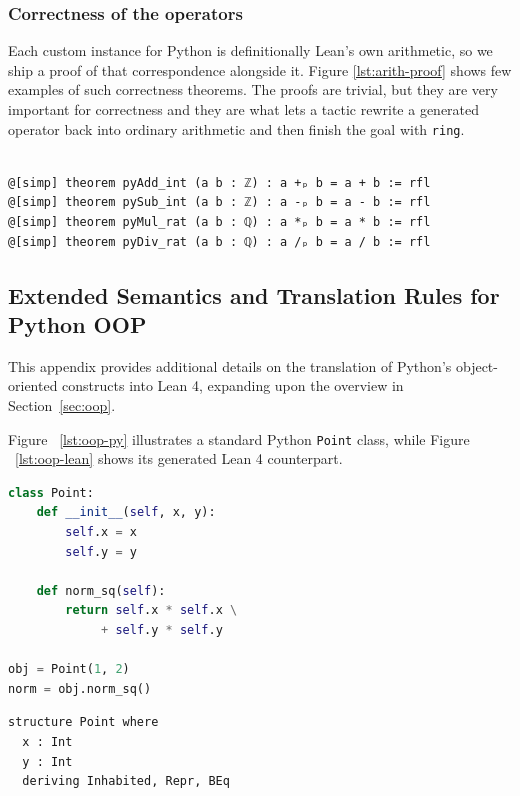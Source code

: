 \documentclass{article}
\newcommand{\code}{\lstinline}
\begin{document}
{\subsubsection{Correctness of the operators} \label{arith-correct}

Each custom instance for Python is definitionally Lean's own arithmetic, so we ship a proof of that correspondence alongside it. Figure \ref{lst:arith-proof} shows few examples of such correctness theorems. The proofs are trivial, but they are very important for correctness and they are what lets a tactic rewrite a generated operator back into ordinary arithmetic and then finish the goal with \code{ring}.

\begin{lstlisting}[style=lean,caption={Arithmetic Operation Proofs},label={lst:arith-proof}]

@[simp] theorem pyAdd_int (a b : ℤ) : a +ₚ b = a + b := rfl
@[simp] theorem pySub_int (a b : ℤ) : a -ₚ b = a - b := rfl
@[simp] theorem pyMul_rat (a b : ℚ) : a *ₚ b = a * b := rfl
@[simp] theorem pyDiv_rat (a b : ℚ) : a /ₚ b = a / b := rfl

\end{lstlisting}

\subsection{Extended Semantics and Translation Rules for Python OOP} \label{oop-appendix}

This appendix provides additional details on the translation of Python's object-oriented constructs into Lean 4, expanding upon the overview in Section~\ref{sec:oop}.

Figure ~\ref{lst:oop-py} illustrates a standard Python \texttt{Point} class, while Figure ~\ref{lst:oop-lean} shows its generated Lean 4 counterpart.

\noindent
\begin{minipage}[t]{0.48\textwidth}
\begin{lstlisting}[language=python, caption={Python \texttt{Point} class.}, label={lst:oop-py}, breaklines=true]
class Point:
    def __init__(self, x, y):
        self.x = x
        self.y = y

    def norm_sq(self):
        return self.x * self.x \
             + self.y * self.y

obj = Point(1, 2)
norm = obj.norm_sq()
\end{lstlisting}
\end{minipage}%
\hfill
\begin{minipage}[t]{0.48\textwidth}
\begin{lstlisting}[language=lean, caption={Lean 4 translation.}, label={lst:oop-lean}, breaklines=true, mathescape=true]
structure Point where
  x : Int
  y : Int
  deriving Inhabited, Repr, BEq


\end{lstlisting}
\end{minipage}}
\end{document}
